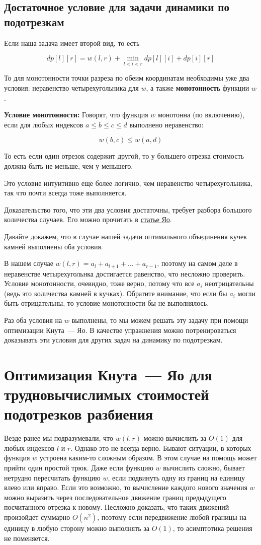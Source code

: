 \subsection{Достаточное условие для задачи динамики по подотрезкам}

Если наша задача имеет второй вид, то есть

$$dp[l][r] = w(l, r) + \min_{l < i < r} dp[l][i] + dp[i][r]$$

То для монотонности точки разреза по обеим координатам необходимы уже два условия: неравенство четырехугольника для $w$, а также \textbf{монотонность} функции $w$.

\textbf{Условие монотонности:} Говорят, что функция $w$ монотонна (по включению), если для любых индексов $a \le b \le c \le d$ выполнено неравенство:

$$w(b, c) \le w(a, d)$$

То есть если один отрезок содержит другой, то у большего отрезка стоимость должна быть не меньше, чем у меньшего.

Это условие интуитивно еще более  логично, чем неравенство четырехугольника, так что почти всегда тоже выполняется.

Доказательство того, что эти два условия достаточны, требует разбора большого количества случаев. Его можно прочитать в \href{https://cse.hkust.edu.hk/mjg_lib/bibs/DPSu/DPSu.Files/p429-yao.pdf}{статье Яо}.

Давайте докажем, что в случае нашей задачи оптимального объединения кучек камней выполнены оба условия.

В нашем случае $w(l, r) = a_l + a_{l + 1} + \ldots + a_{r - 1}$, поэтому на самом деле в неравенстве четырехугольнка достигается равенство, что несложно проверить. Условие монотонности, очевидно, тоже верно, потому что все $a_i$ неотрицательны (ведь это количества камней в кучках). Обратите внимание, что если бы $a_i$ могли быть отрицательны, то условие монотонности бы не выполнялось.

Раз оба условия на $w$ выполнены, то мы можем решать эту задачу при помощи оптимизации Кнута~--- Яо. В качестве упражнения можно потренироваться доказывать эти условия для других задач на динамику по подотрезкам.

\section{Оптимизация Кнута~--- Яо для трудновычислимых стоимостей подотрезков разбиения}

Везде ранее мы подразумевали, что $w(l, r)$ можно вычислить за $O(1)$ для любых индексов $l$ и $r$. Однако это не всегда верно. Бывают ситуации, в которых функция $w$ устроена каким-то сложным образом. В этом случае на помощь может прийти один простой трюк. Даже если функцию $w$ вычислить сложно, бывает нетрудно пересчитать функцию $w$, если подвинуть одну из границ на единицу влево или вправо. Если это возможно, то вычисление каждого нового значения $w$ можно выразить через последовательное движение границ предыдущего посчитанного отрезка к новому. Несложно доказать, что таких движений произойдет суммарно $O(n^2)$, поэтому если передвижение любой границы на единицу в любую сторону можно выполнять за $O(1)$, то асимптотика решения не поменяется.

